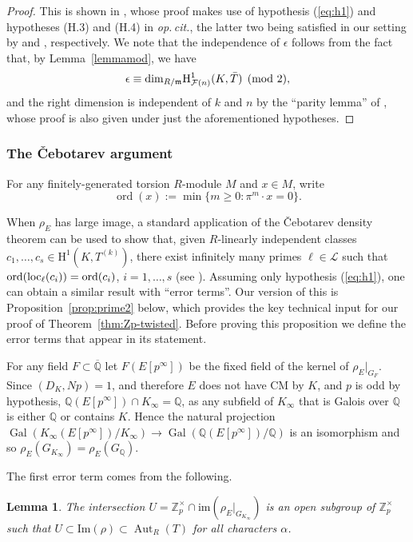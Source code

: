 \documentclass[10pt]{amsart}
\numberwithin{equation}{section}
\newtheorem{lemma}[theorem]{Lemma}
\theoremstyle{definition}
\theoremstyle{remark}
\newcommand{\Z}{\mathbb{Z}}
\newcommand{\cL}{\mathscr{L}}
\newcommand{\Q}{\mathbb{Q}}
\newcommand{\rH}{\mathrm{H}}
\DeclareMathOperator{\ord}{ord}
\DeclareMathOperator{\Gal}{Gal}
\DeclareMathOperator{\Aut}{Aut}
\newcommand{\CF}{\mathcal{F}}
\begin{document}
\begin{proof}
This is shown in \cite[Prop.~1.5.5]{howard}, whose proof makes use of hypothesis (\ref{eq:h1}) and hypotheses (H.3) and (H.4) in \emph{op.\,cit.}, the latter two being satisfied in our setting by \cite[Lem.~3.7.1]{mazrub} and \cite[Lem.~2.2.1]{mazrub}, respectively. We note that the independence of $\epsilon$ follows from the fact that, by Lemma~\ref{lemmamod}, we have
\[
\epsilon\equiv{\rm dim}_{R/\mathfrak{m}}\rH^1_{\CF(n)}(K,\bar{T})\pmod{2},
\]
and the right dimension is independent of $k$ and $n$ by the ``parity lemma'' of \cite[Lem.~1.5.3]{howard}, whose proof is also given under just the aforementioned hypotheses.
\end{proof}


\subsubsection{The \v{C}ebotarev argument}
For any finitely-generated torsion $R$-module $M$ and $x\in M$, write 
\[
\ord(x):=\min\{m\geqslant 0: \pi^m\cdot x =0\}.
\]

When $\rho_E$ has large image, a standard application of the \v{C}ebotarev density theorem can be used to show that, given $R$-linearly independent classes $c_1,\dots,c_s\in\rH^1(K,T^{(k)})$, there exist infinitely many primes $\ell\in\cL$ such 
that ${\rm ord}({\rm loc}_\ell(c_i))={\rm ord}(c_i)$, $i=1,\dots,s$ (see \cite[Cor.~3.2]{mccallum}). 
Assuming only hypothesis (\ref{eq:h1}), one can obtain a similar result with ``error terms''.  Our version of this is 
Proposition~\ref{prop:prime2} below, which provides the key technical input for our proof of Theorem~\ref{thm:Zp-twisted}. 
Before proving this proposition we define the error terms that appear in its statement.

 
For any field $F\subset\overline{\Q}$ let $F(E[p^\infty])$ be the fixed field of the kernel of $\rho_E|_{G_F}$. 
Since $(D_K,Np)=1$, and therefore $E$ does not have CM by $K$, and $p$ is odd by hypothesis, $\Q(E[p^\infty])\cap K_\infty = \Q$, 
as any subfield of $K_\infty$ that is Galois over $\Q$ is either $\Q$ or contains $K$.
Hence the natural projection 
$\Gal(K_\infty(E[p^\infty])/K_\infty)\rightarrow \Gal(\Q(E[p^\infty])/\Q)$ is an isomorphism and 
so $\rho_E(G_{K_\infty}) = \rho_E(G_\Q)$. 

The first error term comes from the following.

\begin{lemma}\label{lem:image1} 
The intersection $U = \Z_p^\times\cap \mathrm{im}(\rho_E|_{G_{K_\infty}})$ is an open subgroup of $\Z_p^\times$
such that $U\subset \mathrm{Im}(\rho)\subset \Aut_R(T)$ for all characters $\alpha$. 
\end{lemma}
\end{document}
